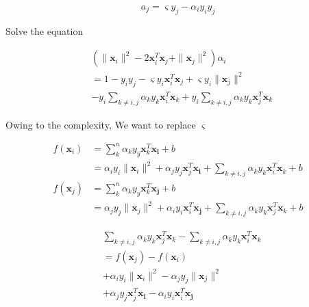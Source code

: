 \documentclass[a4paper,12pt]{article}
\begin{document}
        \begin{equation}
            a_j=\varsigma y_j-\alpha_iy_iy_j
        \end{equation}

        Solve the equation

        \begin{equation}
            \begin{split}
                &(\|\bm{x}_i\|^2-2\bm{x}_i^T\bm{x}_j+\|\bm{x}_j\|^2)\alpha_i\\
                &=1-y_iy_j-\varsigma y_i\bm{x}_i^T\bm{x}_j+\varsigma y_i\|\bm{x}_j\|^2\\
                &-y_i\sum_{k\neq i,j}\alpha_ky_k\bm{x}_i^T\bm{x}_k+y_i\sum_{k\neq i,j}\alpha_ky_k\bm{x}_j^T\bm{x}_k
            \end{split}
        \end{equation}

        Owing to the complexity, We want to replace $\varsigma$

        \begin{equation}
            \begin{split}
                f(\bm{x}_i)&=\sum_{k}^n\alpha_ky_y\bm{x}_k^T\bm{x_i}+b\\
                &=\alpha_iy_i\|\bm{x}_i\|^2+\alpha_jy_j\bm{x}_j^T\bm{x_i}+\sum_{k\neq i,j}\alpha_ky_k\bm{x}_i^T\bm{x}_k+b\\
                f(\bm{x}_j)&=\sum_{k}^n\alpha_ky_y\bm{x}_k^T\bm{x_j}+b\\
                &=\alpha_jy_j\|\bm{x}_j\|^2+\alpha_iy_i\bm{x}_i^T\bm{x_j}+\sum_{k\neq i,j}\alpha_ky_k\bm{x}_j^T\bm{x}_k+b
            \end{split}
        \end{equation}

        \begin{equation}
            \begin{split}
                &\sum_{k\neq i,j}\alpha_ky_k\bm{x}_j^T\bm{x}_k-\sum_{k\neq i,j}\alpha_ky_k\bm{x}_i^T\bm{x}_k\\
                &=f(\bm{x}_j)-f(\bm{x}_i)\\
                &+\alpha_iy_i\|\bm{x}_i\|^2-\alpha_jy_j\|\bm{x}_j\|^2\\
                &+\alpha_jy_j\bm{x}_j^T\bm{x_i}-\alpha_iy_i\bm{x}_i^T\bm{x_j}
            \end{split}
        \end{equation}
\end{document}
